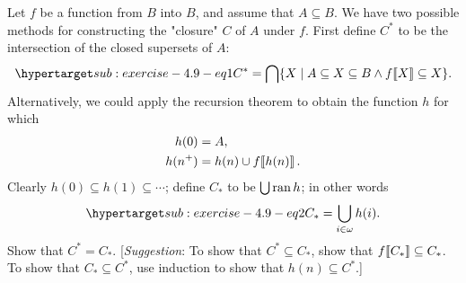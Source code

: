 \documentclass{report}
\begin{document}
  Let $f$ be a function from $B$ into $B$, and assume that $A \subseteq B$.
  We have two possible methods for constructing the "closure" $C$ of $A$ under
    $f$.
  First define $C^*$ to be the intersection of the closed supersets of $A$:
    \begin{equation}
      \hyperlabel{sub:exercise-4.9-eq1}
      C^* = \bigcap\{X \mid
        A \subseteq X \subseteq B \land \img{f}{X} \subseteq X\}.
    \end{equation}
  Alternatively, we could apply the recursion theorem to obtain the function $h$
    for which
    \begin{align*}
      h(0) & = A, \\
      h(n^+) & = h(n) \cup f\!\left\llbracket h(n)\right\rrbracket.
    \end{align*}
  Clearly $h(0) \subseteq h(1) \subseteq \cdots$; define $C_*$ to be
    $\bigcup\mathop{\text{ran}}{h}$; in other words
    \begin{equation}
      \hyperlabel{sub:exercise-4.9-eq2}
      C_* = \bigcup_{i \in \omega} h(i).
    \end{equation}
  Show that $C^* = C_*$.
  [\textit{Suggestion}:
  To show that $C^* \subseteq C_*$, show that $f\!\left\llbracket C_*\right\rrbracket \subseteq C_*$.
  To show that $C_* \subseteq C^*$, use induction to show that
    $h(n) \subseteq C^*$.]
\end{document}
